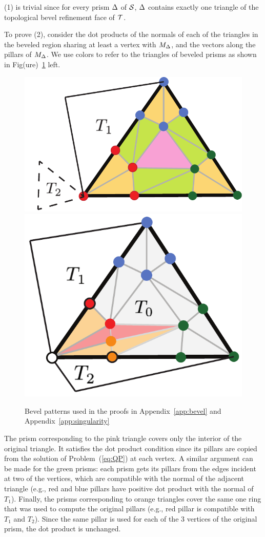 (1) is trivial since for every prism $\Prism$ of $\S$, $\Prism$ contains exactly one {triangle of the topological bevel refinement} face of $\T$.%


To prove (2), consider the dot products of the normals of each of the triangles in the beveled region sharing at least a vertex with $M_\Prism$, and the vectors along the pillars of $M_\Prism$.
We use colors to refer to the triangles of beveled prisms as shown in Fig\remove(ure)~\ref{prism:fig:bevel-explain} left. 


\begin{figure}
    \centering
    \includegraphics[width=0.5\linewidth]{prism-tex/figs/bevel_colors}
    \includegraphics[width=0.4\linewidth]{prism-tex/figs/singularity-bevel-explained}
    \caption{Bevel patterns used in the proofs in Appendix~\ref{app:bevel} and Appendix~\ref{app:singularity}}
    
    \label{prism:fig:bevel-explain}
    \vspace{-1em}
\end{figure}
The prism {corresponding to} the {pink} triangle covers only the interior of the original triangle. It satisfies {the dot product condition} since {its pillars are copied from the solution of Problem~(\ref{eq:QP})} at each vertex. 
A similar argument can be made for the green {prisms}: each  {prism} 
{gets its pillars from the edges}
incident at two of the vertices, {which are compatible with the normal of the adjacent triangle (e.g., red and blue pillars have positive dot product with  {the normal of} $T_1$).}
Finally, the prisms corresponding to orange triangles cover the same one ring that was used to compute the {original pillars (e.g., red pillar is compatible with $T_1$ and $T_2$)}. Since the same {pillar} is used for  each of the 3 vertices of the original prism, {the dot product} is {unchanged}.

